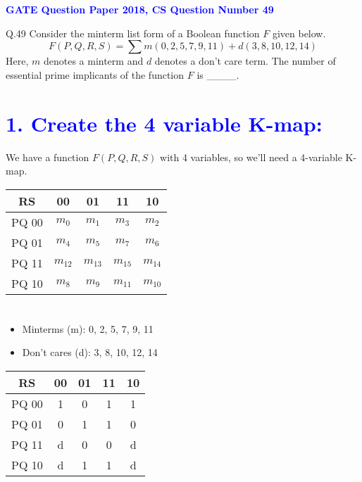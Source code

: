 \documentclass{article}
\begin{document}
\begin{center}
    {\LARGE \textbf{\textcolor{blue}{GATE Question Paper 2018, CS Question Number 49}}}
\end{center}

 
Q.49 Consider the minterm list form of a Boolean function \( F \) given below.
\[
F(P, Q, R, S) = \sum m(0, 2, 5, 7, 9, 11) + d(3, 8, 10, 12, 14)
\]
Here, \( m \) denotes a minterm and \( d \) denotes a don't care term. The number of essential prime implicants of the function \( F \) is \_\_\_\_.
\begin{center}
    {\LARGE \texfot{\textcolor{blue}{ANSWER}}}
\end{center}
\section*{\textbf{\textcolor{blue}{1. Create the 4 variable K-map:}}}

We have a function $F(P, Q, R, S)$ with 4 variables, so we'll need a 4-variable K-map.

\begin{center}
\begin{tabular}{|c|c|c|c|c|}
\hline
\multicolumn{1}{|c|}{RS} & 00 & 01 & 11 & 10 \\ \hline
PQ 00 & $m_0$ & $m_1$ & $m_3$ & $m_2$ \\ \hline
PQ 01 & $m_4$ & $m_5$ & $m_7$ & $m_6$ \\ \hline
PQ 11 & $m_{12}$ & $m_{13}$ & $m_{15}$ & $m_{14}$ \\ \hline
PQ 10 & $m_8$ & $m_9$ & $m_{11}$ & $m_{10}$ \\ \hline
\end{tabular}
\end{center}

\section*{\textfot{\textcolor{blue}{2. Fill in the minterms (m) and don't cares (d):}}}

\begin{itemize}
    \item Minterms (m): 0, 2, 5, 7, 9, 11
    \item Don't cares (d): 3, 8, 10, 12, 14
\end{itemize}

\begin{center}
\begin{tabular}{|c|c|c|c|c|}
\hline
\multicolumn{1}{|c|}{RS} & 00 & 01 & 11 & 10 \\ \hline
PQ 00 & 1 & 0 & 1 & 1 \\ \hline
PQ 01 & 0 & 1 & 1 & 0 \\ \hline
PQ 11 & d & 0 & 0 & d \\ \hline
PQ 10 & d & 1 & 1 & d \\ \hline
\end{tabular}
\end{center}
\end{document}
